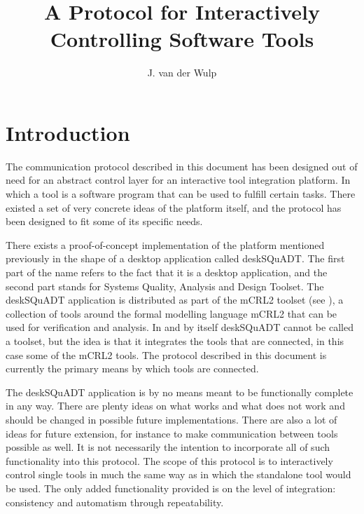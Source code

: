 \documentclass{article}
\title{A Protocol for Interactively Controlling Software Tools}
\author{J. van der Wulp}
\begin{document}
\maketitle

 \section{Introduction}

  The communication protocol described in this document has been designed out
  of need for an abstract control layer for an interactive tool integration
  platform. In which a tool is a software program that can be used to fulfill
  certain tasks. There existed a set of very concrete ideas of the platform
  itself, and the protocol has been designed to fit some of its specific needs.

  There exists a proof-of-concept implementation of the platform mentioned
  previously in the shape of a desktop application called deskSQuADT. The first
  part of the name refers to the fact that it is a desktop application, and the
  second part stands for Systems Quality, Analysis and Design Toolset.  The
  deskSQuADT application is distributed as part of the mCRL2 toolset (see
  \cite{groote_et_al:DSP:2007:862}), a collection of tools around the formal
  modelling language mCRL2 that can be used for verification and analysis.  In
  and by itself deskSQuADT cannot be called a toolset, but the idea is that it
  integrates the tools that are connected, in this case some of the mCRL2
  tools.   The protocol described in this document is currently the primary
  means by which tools are connected.

  The deskSQuADT application is by no means meant to be functionally complete
  in any way. There are plenty ideas on what works and what does not work and
  should be changed in possible future implementations.  There are also a lot
  of ideas for future extension, for instance to make communication between
  tools possible as well. It is not necessarily the intention to incorporate
  all of such functionality into this protocol. The scope of this protocol is
  to interactively control single tools in much the same way as in which the
  standalone tool would be used.  The only added functionality provided is on
  the level of integration: consistency and automatism through repeatability.
\end{document}

